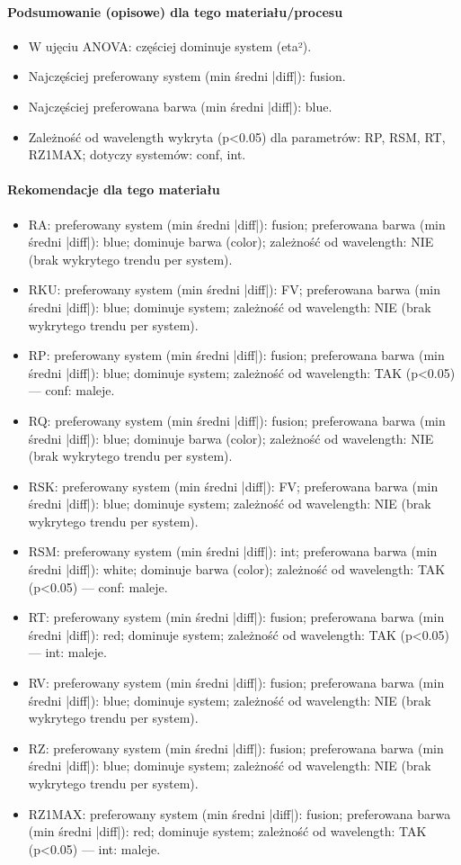 \documentclass[
  10pt,
]{article}
\begin{document}
\paragraph{Podsumowanie (opisowe) dla tego materiału/procesu}
\begin{itemize}
\item W ujęciu ANOVA: częściej dominuje system (eta²).
\item Najczęściej preferowany system (min średni |diff|): fusion.
\item Najczęściej preferowana barwa (min średni |diff|): blue.
\item Zależność od wavelength wykryta (p<0.05) dla parametrów: RP, RSM, RT, RZ1MAX; dotyczy systemów: conf, int.
\end{itemize}
\paragraph{Rekomendacje dla tego materiału}
\begin{itemize}
\item RA: preferowany system (min średni |diff|): fusion; preferowana barwa (min średni |diff|): blue; dominuje barwa (color); zależność od wavelength: NIE (brak wykrytego trendu per system).
\item RKU: preferowany system (min średni |diff|): FV; preferowana barwa (min średni |diff|): blue; dominuje system; zależność od wavelength: NIE (brak wykrytego trendu per system).
\item RP: preferowany system (min średni |diff|): fusion; preferowana barwa (min średni |diff|): blue; dominuje system; zależność od wavelength: TAK (p<0.05) — conf: maleje.
\item RQ: preferowany system (min średni |diff|): fusion; preferowana barwa (min średni |diff|): blue; dominuje barwa (color); zależność od wavelength: NIE (brak wykrytego trendu per system).
\item RSK: preferowany system (min średni |diff|): FV; preferowana barwa (min średni |diff|): blue; dominuje system; zależność od wavelength: NIE (brak wykrytego trendu per system).
\item RSM: preferowany system (min średni |diff|): int; preferowana barwa (min średni |diff|): white; dominuje barwa (color); zależność od wavelength: TAK (p<0.05) — conf: maleje.
\item RT: preferowany system (min średni |diff|): fusion; preferowana barwa (min średni |diff|): red; dominuje system; zależność od wavelength: TAK (p<0.05) — int: maleje.
\item RV: preferowany system (min średni |diff|): fusion; preferowana barwa (min średni |diff|): blue; dominuje system; zależność od wavelength: NIE (brak wykrytego trendu per system).
\item RZ: preferowany system (min średni |diff|): fusion; preferowana barwa (min średni |diff|): blue; dominuje system; zależność od wavelength: NIE (brak wykrytego trendu per system).
\item RZ1MAX: preferowany system (min średni |diff|): fusion; preferowana barwa (min średni |diff|): red; dominuje system; zależność od wavelength: TAK (p<0.05) — int: maleje.
\end{itemize}
\end{document}

